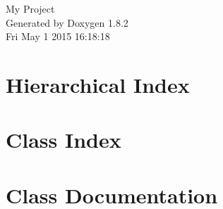 \documentclass{book}
\begin{document}
\hypersetup{pageanchor=false,citecolor=blue}
\begin{titlepage}
\vspace*{7cm}
\begin{center}
{\Large My Project }\\
\vspace*{1cm}
{\large Generated by Doxygen 1.8.2}\\
\vspace*{0.5cm}
{\small Fri May 1 2015 16:18:18}\\
\end{center}
\end{titlepage}
\clearemptydoublepage
{}
\tableofcontents
\clearemptydoublepage
{}
\hypersetup{pageanchor=true,citecolor=blue}
\chapter{Hierarchical Index}

\chapter{Class Index}

\chapter{Class Documentation}






























\printindex
\end{document}
